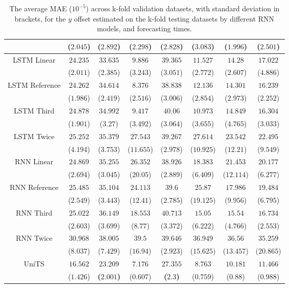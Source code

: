 \begin{table}[!ht]
{\begin{tabular}{|c|c|c|c|c|c|c|c|}
			 & ($2.045$) & ($2.892$) & ($2.298$) & ($2.828$) & ($3.083$) & ($1.996$) & ($2.501$) \\ \hline
			\multirow{2}{*}{LSTM Linear} & $24.235$ & $33.635$ & $9.886$ & $39.365$ & $11.527$ & $14.28$ & $17.022$ \\
			 & ($2.011$) & ($2.385$) & ($3.243$) & ($3.051$) & ($2.772$) & ($2.607$) & ($4.886$) \\ \hline
			\multirow{2}{*}{LSTM Reference} & $24.262$ & $34.614$ & $8.376$ & $38.838$ & $12.136$ & $14.301$ & $16.239$ \\
			 & ($1.986$) & ($2.419$) & ($2.516$) & ($3.006$) & ($2.854$) & ($2.973$) & ($2.252$) \\ \hline
			\multirow{2}{*}{LSTM Third} & $24.878$ & $34.992$ & $9.417$ & $40.06$ & $10.973$ & $14.849$ & $16.304$ \\
			 & ($1.901$) & ($3.27$) & ($3.492$) & ($3.064$) & ($3.655$) & ($4.765$) & ($3.033$) \\ \hline
			\multirow{2}{*}{LSTM Twice} & $25.252$ & $35.379$ & $27.543$ & $39.267$ & $27.614$ & $23.542$ & $22.495$ \\
			 & ($4.194$) & ($3.753$) & ($11.655$) & ($2.978$) & ($10.925$) & ($12.21$) & ($9.549$) \\ \hline
			\multirow{2}{*}{RNN Linear} & $24.869$ & $35.255$ & $26.352$ & $38.926$ & $18.383$ & $21.453$ & $20.177$ \\
			 & ($2.694$) & ($3.045$) & ($20.05$) & ($2.889$) & ($6.409$) & ($12.114$) & ($6.277$) \\ \hline
			\multirow{2}{*}{RNN Reference} & $25.485$ & $35.104$ & $24.113$ & $39.6$ & $25.87$ & $17.986$ & $19.484$ \\
			 & ($2.549$) & ($3.443$) & ($12.41$) & ($2.785$) & ($19.125$) & ($9.956$) & ($6.795$) \\ \hline
			\multirow{2}{*}{RNN Third} & $25.022$ & $36.149$ & $18.553$ & $40.713$ & $15.05$ & $15.54$ & $16.734$ \\
			 & ($2.603$) & ($3.699$) & ($8.77$) & ($3.372$) & ($6.222$) & ($4.766$) & ($2.553$) \\ \hline
			\multirow{2}{*}{RNN Twice} & $30.968$ & $38.005$ & $39.5$ & $39.646$ & $36.949$ & $36.56$ & $35.259$ \\
			 & ($8.037$) & ($7.429$) & ($16.94$) & ($2.923$) & ($15.625$) & ($13.457$) & ($20.865$) \\ \hline
			\multirow{2}{*}{UniTS} & $16.562$ & $\mathbf{23.209}$ & $7.176$ & $\mathbf{27.355}$ & $8.763$ & $10.181$ & $11.466$ \\
			 & ($1.426$) & \textbf{(}$\mathbf{2.001}$\textbf{)} & ($0.607$) & \textbf{(}$\mathbf{2.3}$\textbf{)} & ($0.759$) & ($0.88$) & ($0.988$) \\ \hline
		\end{tabular}
	}
	\caption{The average MAE ($10^{-5}$) across k-fold validation datasets, with standard deviation in brackets, for the $y$ offset estimated on the k-fold testing datasets by different RNN models, and forecasting times.}
	\label{tab:all_latitude_no_abs_MAE}
\end{table}